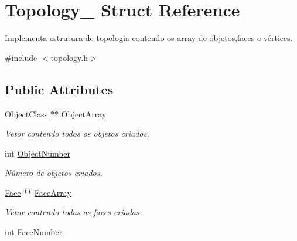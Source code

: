 \hypertarget{struct_topology__}{\section{Topology\-\_\- Struct Reference}
\label{struct_topology__}
}


Implementa estrutura de topologia contendo os array de objetos,faces e vértices.  




{\ttfamily \#include $<$topology.\-h$>$}

\subsection*{Public Attributes}
\begin{DoxyCompactItemize}
\item 
\hypertarget{struct_topology___aa8e322c6ad07a87561482796450c50ea}{\hyperlink{class_object_class}{Object\-Class} $\ast$$\ast$ \hyperlink{struct_topology___aa8e322c6ad07a87561482796450c50ea}{Object\-Array}}\label{struct_topology___aa8e322c6ad07a87561482796450c50ea}

\begin{DoxyCompactList}\small\item\em Vetor contendo todos os objetos criados. \end{DoxyCompactList}\item 
\hypertarget{struct_topology___a574393bd9821bd33cb37d26e9421983e}{int \hyperlink{struct_topology___a574393bd9821bd33cb37d26e9421983e}{Object\-Number}}\label{struct_topology___a574393bd9821bd33cb37d26e9421983e}

\begin{DoxyCompactList}\small\item\em Número de objetos criados. \end{DoxyCompactList}\item 
\hypertarget{struct_topology___a7931f7ae16d3b733ff4cf335ed0403a1}{\hyperlink{class_face}{Face} $\ast$$\ast$ \hyperlink{struct_topology___a7931f7ae16d3b733ff4cf335ed0403a1}{Face\-Array}}\label{struct_topology___a7931f7ae16d3b733ff4cf335ed0403a1}

\begin{DoxyCompactList}\small\item\em Vetor contendo todas as faces criadas. \end{DoxyCompactList}\item 
\hypertarget{struct_topology___a71ae41c753c4d13da1790df2e0a207c0}{int \hyperlink{struct_topology___a71ae41c753c4d13da1790df2e0a207c0}{Face\-Number}}\label{struct_topology___a71ae41c753c4d13da1790df2e0a207c0}


\end{DoxyCompactItemize}

